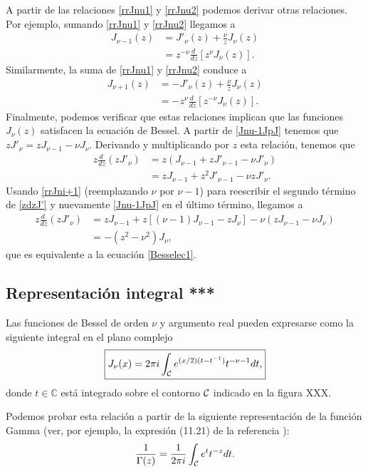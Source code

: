 A partir de las relaciones \eqref{rrJnu1} y \eqref{rrJnu2} podemos derivar otras relaciones. Por ejemplo, sumando \eqref{rrJnu1} y \eqref{rrJnu2} llegamos a
\begin{align}
J_{\nu-1}(z) &= J'_{\nu}(z)+\frac{\nu}{z}J_\nu(z) \label{Jnu-1JpJ}\\
&= z^{-\nu}\frac{d\ }{dz}\left[z^\nu J_\nu(z)\right]. \label{Jnu-1JpJ2}
\end{align}
Similarmente, la suma de \eqref{rrJnu1} y \eqref{rrJnu2} conduce a 
\begin{align}
J_{\nu+1}(z) &= -J'_{\nu}(z)+\frac{\nu}{z}J_\nu(z) \label{rrJni+1} \\
&= -z^{\nu}\frac{d\ }{dz}\left[z^{-\nu} J_\nu(z)\right]. \label{rrJni+2}
\end{align}
Finalmente, podemos verificar que estas relaciones implican que las funciones $J_\nu(z)$ satisfacen la ecuación de Bessel. A partir de \eqref{Jnu-1JpJ} tenemos que $zJ'_\nu=zJ_{\nu-1}-\nu J_\nu$. Derivando y multiplicando por $z$ esta relación, tenemos que
\begin{align}
z\frac{d\ }{dz}(zJ'_\nu) &= z\left(J_{\nu-1}+zJ'_{\nu-1}-\nu J'_\nu\right)\\
&= zJ_{\nu-1}+z^2J'_{\nu-1}-\nu zJ'_\nu. \label{zdzJ'}
\end{align}
Usando \eqref{rrJni+1} (reemplazando $\nu$ por $\nu-1$) para reescribir el segundo término de \eqref{zdzJ'} y nuevamente \eqref{Jnu-1JpJ} en el último término, llegamos a
\begin{align}
z\frac{d\ }{dz}(zJ'_\nu) &= zJ_{\nu-1}+z\left[(\nu-1)J_{\nu-1}-zJ_\nu\right]-\nu (zJ_{\nu-1}-\nu J_\nu) \\
&= -(z^2-\nu^2) J_\nu,
\end{align}
que es equivalente a la ecuación \eqref{Besselec1}.

\subsection{Representación integral ***}
Las funciones de Bessel de orden $\nu$ y argumento real pueden expresarse como la siguiente integral en el plano complejo
\begin{equation}\label{RIJnu}
\boxed{J_\nu(x)=2\pi i\int_{\cal C}e^{(x/2)(t-t^{-1})}t^{-\nu-1}dt,}
\end{equation}
donde $t\in\mathbb{C}$ está integrado sobre el contorno $\cal C$ indicado en la figura XXX.

Podemos probar esta relación a partir de la siguiente representación de la función Gamma (ver, por ejemplo, la expresión (11.21) de la referencia \cite{Hassani}):
\begin{equation}\label{1sGint}
\frac{1}{\Gamma(z)}=\frac{1}{2\pi i}\int_{\cal C}e^t t^{-z}dt.
\end{equation}

